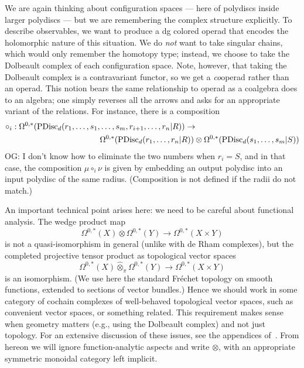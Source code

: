 \documentclass[11pt]{amsart}
\def\owen#1{{\textcolor{violet!65!black}{OG: {#1}}}}
\begin{document}
We are again thinking about configuration spaces --- here of polydiscs inside larger polydiscs --- but we are remembering the complex structure explicitly.
To describe observables, we want to produce a dg colored operad that encodes the holomorphic nature of this situation.
We do {\em not} want to take singular chains, which would only remember the homotopy type;
instead, we choose to take the Dolbeault complex of each configuration space.
Note, however, that taking the Dolbeault complex is a contravariant functor,
so we get a {\em co}\/operad rather than an operad.
This notion bears the same relationship to operad as a coalgebra does to an algebra;
one simply reverses all the arrows and asks for an appropriate variant of the relations.
For instance, there is a composition
\begin{align}
\label{pdcirc}
\circ_i: \Omega^{0,*}({\rm PDisc}_d(r_1, \ldots, s_1, &\ldots, s_m, r_{i+1}, \ldots, r_n| R)) \to \\
&\Omega^{0,*}({\rm PDisc}_d(r_1, \ldots, r_n| R)) \otimes \Omega^{0,*}({\rm PDisc}_d(s_1, \ldots, s_m| S))
\end{align}
\owen{I don't know how to eliminate the two numbers}
when $r_i = S$, and in that case, the composition $\mu \circ_i \nu$ is given by embedding an output polydisc into an input polydisc of the same radius.
(Composition is not defined if the radii do not match.)

An important technical point arises here: 
we need to be careful about functional analysis.
The wedge product map
\[
\Omega^{0,*}(X) \otimes \Omega^{0,*}(Y) \to \Omega^{0,*}(X \times Y)
\]
is not a quasi-isomorphism in general (unlike with de Rham complexes),
but the completed projective tensor product as topological vector spaces 
\[
\Omega^{0,*}(X) \widehat{\otimes}_\pi \Omega^{0,*}(Y) \to \Omega^{0,*}(X \times Y)
\]
is an isomorphism.
(We use here the standard Fr\'echet topology on smooth functions, extended to sections of vector bundles.)
Hence we should work in some category of cochain complexes of well-behaved topological vector spaces, such as convenient vector spaces, or something related.
This requirement makes sense when geometry matters (e.g., using the Dolbeault complex) and not just topology.
For an extensive discussion of these issues, see the appendices of~\cite{CG1}.
From hereon we will ignore function-analytic aspects and write $\otimes$,
with an appropriate symmetric monoidal category left implicit.
\end{document}
